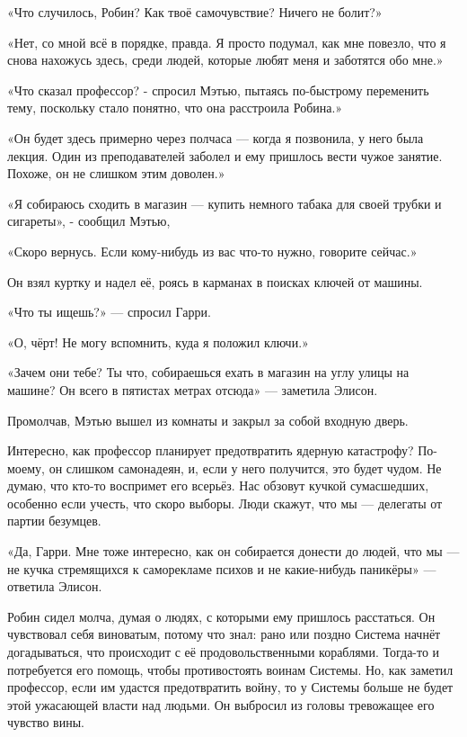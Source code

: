 \documentclass[a4paper,12pt]{book}
\begin{document}
\par
«Что случилось, Робин? Как твоё самочувствие? Ничего не болит?»
\par
«Нет, со мной всё в порядке, правда. Я просто подумал, как мне повезло, что я снова нахожусь здесь, среди людей, которые любят меня и заботятся обо мне.»
\par
«Что сказал профессор? - спросил Мэтью, пытаясь по-быстрому переменить тему, поскольку стало понятно, что она расстроила Робина.»
\par
«Он будет здесь примерно через полчаса — когда я позвонила, у него была лекция. Один из преподавателей заболел и ему пришлось вести чужое занятие. Похоже, он не слишком этим доволен.»
\par
«Я собираюсь сходить в магазин — купить немного табака для своей трубки и сигареты», - сообщил Мэтью,
\par
«Скоро вернусь. Если кому-нибудь из вас что-то нужно, говорите сейчас.»
\par
Он взял куртку и надел её, роясь в карманах в поисках ключей от машины.
\par
«Что ты ищешь?» — спросил Гарри.
\par
«О, чёрт! Не могу вспомнить, куда я положил ключи.»
\par
«Зачем они тебе? Ты что, собираешься ехать в магазин на углу улицы на машине? Он всего в пятистах метрах отсюда» — заметила Элисон.
\par
Промолчав, Мэтью вышел из комнаты и закрыл за собой входную дверь.
\par
Интересно, как профессор планирует предотвратить ядерную катастрофу? По-моему, он слишком самонадеян, и, если у него получится, это будет чудом. Не думаю, что кто-то воспримет его всерьёз. Нас обзовут кучкой сумасшедших, особенно если учесть, что скоро выборы. Люди скажут, что мы — делегаты от партии безумцев.
\par
«Да, Гарри. Мне тоже интересно, как он собирается донести до людей, что мы — не кучка стремящихся к саморекламе психов и не какие-нибудь паникёры» — ответила Элисон.
\par
Робин сидел молча, думая о людях, с которыми ему пришлось расстаться. Он чувствовал себя виноватым, потому что знал: рано или поздно Система начнёт догадываться, что происходит с её продовольственными кораблями. Тогда-то и потребуется его помощь, чтобы противостоять воинам Системы. Но, как заметил профессор, если им удастся предотвратить войну, то у Системы больше не будет этой ужасающей власти над людьми. Он выбросил из головы тревожащее его чувство вины.\\
\end{document}
